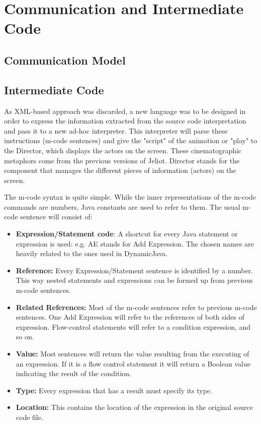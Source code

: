 \section{Communication and Intermediate Code}
\label{sec:Communications_and_Intermediate_Code}


\subsection{Communication Model}
\label{sec:Communication_Model}


\subsection{Intermediate Code}
\label{sec:Intermediate_Code}

As XML-based approach was discarded, a new language was to be designed in order to express the information extracted from the source code interpretation and pass it to a new ad-hoc interpreter. This interpreter will parse these instructions (m-code sentences) and give the "script" of the animation or "play" to the Director, which displays the actors on the screen. These cinematographic metaphors come from the previous versions of Jeliot. Director stands for the component that manages the different pieces of information (actors) on the screen.

The m-code syntax is quite simple. While the inner representations of the m-code commands are numbers, Java constants are used to refer to them. The usual m-code sentence will consist of:

\begin{itemize}
\item {\bf{Expression/Statement code}}: A shortcut for every Java statement or expression is used: e.g. AE stands for Add Expression. The chosen names are heavily related to the ones used in DynamicJava.
\item {\bf{Reference:}} Every Expression/Statement sentence is identified by a number. This way nested statements and expressions can be formed up from previous m-code sentences.
\item {\bf{Related References:}} Most of the m-code sentences refer to previous m-code sentences. One Add Expression will refer to the references of both sides of expression. Flow-control statements will refer to a condition expression, and so on.
\item {\bf{Value:}} Most sentences will return the value resulting from the executing of an expression. If it is a flow control statement it will return a Boolean value indicating the result of the condition.
\item {\bf{Type:}} Every expression that has a result must specify its type.
\item {\bf{Location:}} This contains the location of the expression in the original source code file.
\end{itemize}

